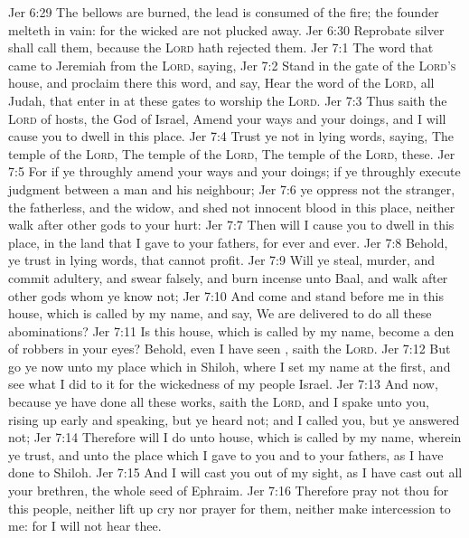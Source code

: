 \vs Jer 6:29 The bellows are burned, the lead is consumed of the fire; the founder melteth in vain: for the wicked are not plucked away.
\vs Jer 6:30 Reprobate silver shall  call them, because the \textsc{Lord} hath rejected them.
\vs Jer 7:1 The word that came to Jeremiah from the \textsc{Lord}, saying,
\vs Jer 7:2 Stand in the gate of the \textsc{Lord's} house, and proclaim there this word, and say, Hear the word of the \textsc{Lord}, all  Judah, that enter in at these gates to worship the \textsc{Lord}.
\vs Jer 7:3 Thus saith the \textsc{Lord} of hosts, the God of Israel, Amend your ways and your doings, and I will cause you to dwell in this place.
\vs Jer 7:4 Trust ye not in lying words, saying, The temple of the \textsc{Lord}, The temple of the \textsc{Lord}, The temple of the \textsc{Lord},  these.
\vs Jer 7:5 For if ye throughly amend your ways and your doings; if ye throughly execute judgment between a man and his neighbour;
\vs Jer 7:6  ye oppress not the stranger, the fatherless, and the widow, and shed not innocent blood in this place, neither walk after other gods to your hurt:
\vs Jer 7:7 Then will I cause you to dwell in this place, in the land that I gave to your fathers, for ever and ever.
\vs Jer 7:8 Behold, ye trust in lying words, that cannot profit.
\vs Jer 7:9 Will ye steal, murder, and commit adultery, and swear falsely, and burn incense unto Baal, and walk after other gods whom ye know not;
\vs Jer 7:10 And come and stand before me in this house, which is called by my name, and say, We are delivered to do all these abominations?
\vs Jer 7:11 Is this house, which is called by my name, become a den of robbers in your eyes? Behold, even I have seen , saith the \textsc{Lord}.
\vs Jer 7:12 But go ye now unto my place which  in Shiloh, where I set my name at the first, and see what I did to it for the wickedness of my people Israel.
\vs Jer 7:13 And now, because ye have done all these works, saith the \textsc{Lord}, and I spake unto you, rising up early and speaking, but ye heard not; and I called you, but ye answered not;
\vs Jer 7:14 Therefore will I do unto  house, which is called by my name, wherein ye trust, and unto the place which I gave to you and to your fathers, as I have done to Shiloh.
\vs Jer 7:15 And I will cast you out of my sight, as I have cast out all your brethren,  the whole seed of Ephraim.
\vs Jer 7:16 Therefore pray not thou for this people, neither lift up cry nor prayer for them, neither make intercession to me: for I will not hear thee.
